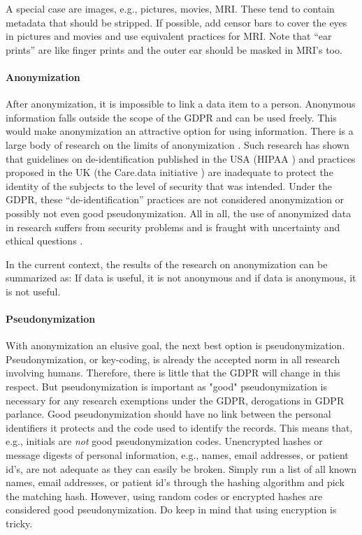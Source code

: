 \documentclass[10pt, a4paper]{article}
\begin{document}
A special case are images, e.g., pictures, movies, MRI. These tend to contain metadata that should be stripped. If possible, add censor bars to cover the eyes in pictures and movies and use equivalent practices for MRI. Note that ``ear prints'' are like finger prints and the outer ear should be masked in MRI's too.

\paragraph{Anonymization} After anonymization, it is impossible to link a data item to a person. Anonymous information falls outside the scope of the GDPR and can be used freely. This would make anonymization an attractive option for using information. There is a large body of research on the limits of anonymization \cite{henriksen2016re,ye2016survey}. Such research has shown that guidelines on de-identification published in the USA (HIPAA \cite{us2012guidance}) and practices proposed in the UK (the Care.data initiative \cite{presser2015care}) are inadequate to protect the identity of the subjects to the level of security that was intended. Under the GDPR, these ``de-identification'' practices are not considered anonymization or possibly not even good pseudonymization. All in all, the use of anonymized data in research suffers from security problems and is fraught with uncertainty and ethical questions \cite{rumbold2017critique}.

In the current context, the results of the research on anonymization can be summarized as: If data is useful, it is not anonymous and if data is anonymous, it is not useful.

\paragraph{Pseudonymization} With anonymization an elusive goal, the next best option is pseudo\-nymization. Pseudo\-nymization, or key-coding, is already the accepted norm in all research involving humans. Therefore, there is little that the GDPR will change in this respect. But pseudonymization is important as "good" pseudonymization is necessary for any research exemptions under the GDPR, derogations in GDPR parlance. Good pseudonymization should have no link between the personal identifiers it protects and the code used to identify the records. This means that, e.g., initials are \emph{not} good pseudonymization codes. Unencrypted hashes or message digests of personal information, e.g., names, email addresses, or patient id's, are not adequate as they can easily be broken. Simply run a list of all known names, email addresses, or patient id's through the hashing algorithm and pick the matching hash. However, using random codes or encrypted hashes are considered good pseudonymization. Do keep in mind that using encryption is tricky.
\end{document}
